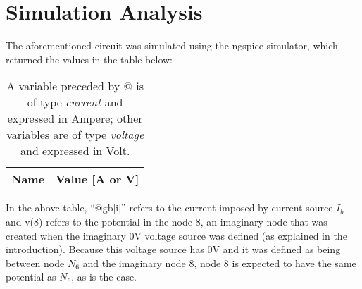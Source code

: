 \section{Simulation Analysis}
\label{sec:simulation}

\par
The aforementioned circuit was simulated using the ngspice simulator, which returned the values in the table below:
\par

\begin{table}[h]
  \centering
  \begin{tabular}{|l|r|}
    \hline    
    {\bf Name} & {\bf Value [A or V]} \\ \hline
    
  \end{tabular}
  \caption{A variable preceded by @ is of type {\em current} and expressed in Ampere; other variables are of type {\it voltage} and expressed in Volt.}
  \label{tab:sim}
\end{table}

In the above table, ``@gb[i]'' refers to the current imposed by current source $I_b$ and v(8) refers to the potential in the node 8, an imaginary node that was created when the imaginary 0V voltage source was defined (as explained in the introduction). Because this voltage source has 0V and it was defined as being between node $N_6$ and the imaginary node 8, node 8 is expected to have the same potential as $N_6$, as is the case.



